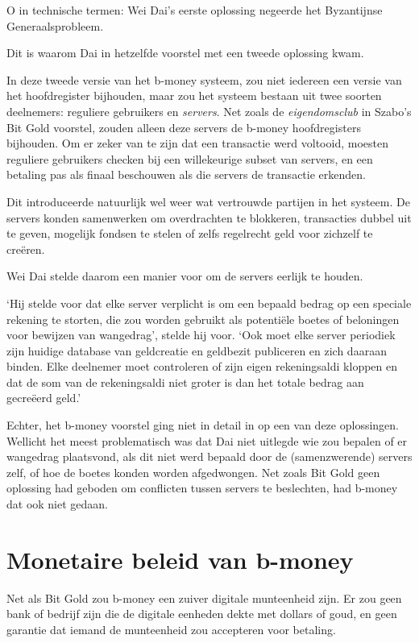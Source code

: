 \documentclass[
  a5paper,
  smalldemyvopaper,11pt,twoside,onecolumn,openright,extrafontsizes,
hidelinks]{memoir}
\begin{document}
O in technische termen: Wei Dai's eerste oplossing negeerde het
Byzantijnse Generaalsprobleem.

Dit is waarom Dai in hetzelfde voorstel met een tweede oplossing kwam.

In deze tweede versie van het b-money systeem, zou niet iedereen een
versie van het hoofdregister bijhouden, maar zou het systeem bestaan uit
twee soorten deelnemers: reguliere gebruikers en \emph{servers}. Net
zoals de \emph{eigendomsclub} in Szabo's Bit Gold voorstel, zouden
alleen deze servers de b-money hoofdregisters bijhouden. Om er zeker van
te zijn dat een transactie werd voltooid, moesten reguliere gebruikers
checken bij een willekeurige subset van servers, en een betaling pas als
finaal beschouwen als die servers de transactie erkenden.

Dit introduceerde natuurlijk wel weer wat vertrouwde partijen in het
systeem. De servers konden samenwerken om overdrachten te blokkeren,
transacties dubbel uit te geven, mogelijk fondsen te stelen of zelfs
regelrecht geld voor zichzelf te creëren.

Wei Dai stelde daarom een manier voor om de servers eerlijk te houden.

`Hij stelde voor dat elke server verplicht is om een bepaald bedrag op
een speciale rekening te storten, die zou worden gebruikt als potentiële
boetes of beloningen voor bewijzen van wangedrag', stelde hij voor. `Ook
moet elke server periodiek zijn huidige database van geldcreatie en
geldbezit publiceren en zich daaraan binden. Elke deelnemer moet
controleren of zijn eigen rekeningsaldi kloppen en dat de som van de
rekeningsaldi niet groter is dan het totale bedrag aan gecreëerd geld.'

Echter, het b-money voorstel ging niet in detail in op een van deze
oplossingen. Wellicht het meest problematisch was dat Dai niet uitlegde
wie zou bepalen of er wangedrag plaatsvond, als dit niet werd bepaald
door de (samenzwerende) servers zelf, of hoe de boetes konden worden
afgedwongen. Net zoals Bit Gold geen oplossing had geboden om conflicten
tussen servers te beslechten, had b-money dat ook niet gedaan.

\section{Monetaire beleid van
b-money}\label{monetaire-beleid-van-b-money}

Net als Bit Gold zou b-money een zuiver digitale munteenheid zijn. Er
zou geen bank of bedrijf zijn die de digitale eenheden dekte met dollars
of goud, en geen garantie dat iemand de munteenheid zou accepteren voor
betaling.
\end{document}
